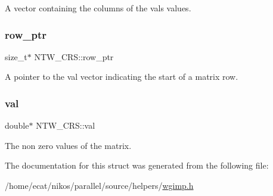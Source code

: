 A vector containing the columns of the val\textquotesingle{}s values. \mbox{\label{structNTW__CRS_af5999845d1d6173e930a1c502042d239}} 
\subsubsection{\texorpdfstring{row\+\_\+ptr}{row\_ptr}}
{\footnotesize\ttfamily size\+\_\+t$\ast$ N\+T\+W\+\_\+\+C\+R\+S\+::row\+\_\+ptr}

A pointer to the val vector indicating the start of a matrix\textquotesingle{} row. \mbox{\label{structNTW__CRS_abe01efe3d4a64ef6ed470021481a03ae}} 
\subsubsection{\texorpdfstring{val}{val}}
{\footnotesize\ttfamily double$\ast$ N\+T\+W\+\_\+\+C\+R\+S\+::val}

The non zero values of the matrix. 

The documentation for this struct was generated from the following file\+:\begin{DoxyCompactItemize}
\item 
/home/ecat/nikos/parallel/source/helpers/\mbox{\hyperlink{wgimp_8h}{wgimp.\+h}}\end{DoxyCompactItemize}
